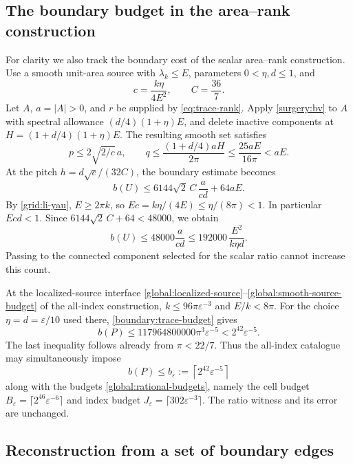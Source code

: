 \documentclass[11pt,reqno]{amsart}
\numberwithin{equation}{section}
\newcommand{\abs}[1]{\lvert#1\rvert}
\begin{document}
\subsection{The boundary budget in the area--rank construction}
\label{boundary:trace-section}

For clarity we also track the boundary cost of the scalar
area--rank construction.  Use a smooth unit-area source with
\(\lambda_k\le E\), parameters \(0<\eta,d\le1\), and
\[
 c=\frac{k\eta}{4E^2},\qquad C=\frac{36}{7}.
\]
Let \(A\), \(a=\abs A>0\), and \(r\) be supplied by
\eqref{eq:trace-rank}.  Apply \eqref{surgery:bv} to \(A\) with
spectral allowance \((d/4)(1+\eta)E\), and delete inactive components at
\(H=(1+d/4)(1+\eta)E\).  The resulting smooth set satisfies
\[
 p\le2\sqrt{2/c}\,a,\qquad
 q\le\frac{(1+d/4)aH}{2\pi}
 \le\frac{25aE}{16\pi}<aE.
\]
At the pitch \(h=d\sqrt c/(32C)\), the boundary estimate becomes
\[
 b(U)\le6144\sqrt2\,C\,\frac{a}{cd}+64aE.
\]
By \eqref{grid:li-yau}, \(E\ge2\pi k\), so
\(Ec=k\eta/(4E)\le\eta/(8\pi)<1\).
In particular \(Ecd<1\).  Since
\(6144\sqrt2\,C+64<48000\), we obtain
\begin{equation}
 b(U)\le48000\frac{a}{cd}
       \le192000\,\frac{E^2}{k\eta d}.
 \label{boundary:trace-budget}
\end{equation}
Passing to the connected component selected for the scalar ratio
cannot increase this count.

At the localized-source interface
\eqref{global:localized-source}--\eqref{global:smooth-source-budget}
of the all-index construction,
\(k\le96\pi\varepsilon^{-3}\) and \(E/k<8\pi\).
For the choice \(\eta=d=\varepsilon/10\) used there,
\eqref{boundary:trace-budget} gives
\[
 b(P)\le117964800000\pi^3\varepsilon^{-5}
       <2^{42}\varepsilon^{-5}.
\]
The last inequality follows already from \(\pi<22/7\).
Thus the all-index catalogue may simultaneously impose
\begin{equation}
 b(P)\le b_\varepsilon
 :=\left\lceil2^{42}\varepsilon^{-5}\right\rceil
 \label{boundary:global-budget}
\end{equation}
along with the budgets \eqref{global:rational-budgets}, namely
the cell budget
\(B_\varepsilon=\lceil2^{46}\varepsilon^{-6}\rceil\) and index
budget \(J_\varepsilon=\lceil302\varepsilon^{-3}\rceil\).
The ratio witness and its error are unchanged.

\subsection{Reconstruction from a set of boundary edges}
\label{boundary:enumeration-section}
\end{document}
